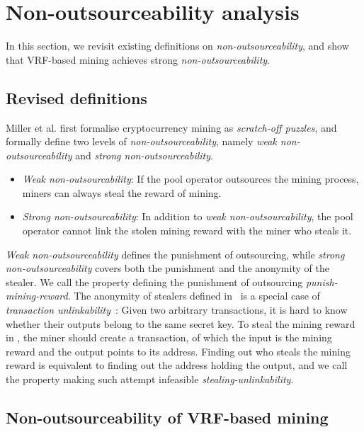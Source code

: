 \section{Non-outsourceability analysis}
\label{sec:non_outsourceability}

In this section, we revisit existing definitions on \emph{non-outsourceability}, and show that VRF-based mining achieves strong \emph{non-outsourceability}.

\subsection{Revised definitions}

Miller et al. \cite{miller2015nonoutsourceable} first formalise cryptocurrency mining as \emph{scratch-off puzzles}, and formally define two levels of \emph{non-outsourceability}, namely \emph{weak non-outsourceability} and \emph{strong non-outsourceability}.

\begin{itemize}
    \item \emph{Weak non-outsourcability}: If the pool operator outsources the mining process, miners can always steal the reward of mining.
    \item \emph{Strong non-outsourcability}: In addition to \emph{weak non-outsourcability}, the pool operator cannot link the stolen mining reward with the miner who steals it.
\end{itemize}

\emph{Weak non-outsourceability} defines the punishment of outsourcing, while \emph{strong non-outsourceability} covers both the punishment and the anonymity of the stealer.
We call the property defining the punishment of outsourcing \emph{punish-mining-reward}.
The anonymity of stealers defined in~\cite{miller2015nonoutsourceable} is a special case of \emph{transaction unlinkability}~\cite{van2013cryptonote}: Given two arbitrary transactions, it is hard to know whether their outputs belong to the same secret key.
To steal the mining reward in \cite{miller2015nonoutsourceable}, the miner should create a transaction, of which the input is the mining reward and the output points to its address.
Finding out who steals the mining reward is equivalent to finding out the address holding the output, and we call the property making such attempt infeasible \emph{stealing-unlinkability}.




\subsection{Non-outsourceability of VRF-based mining}

